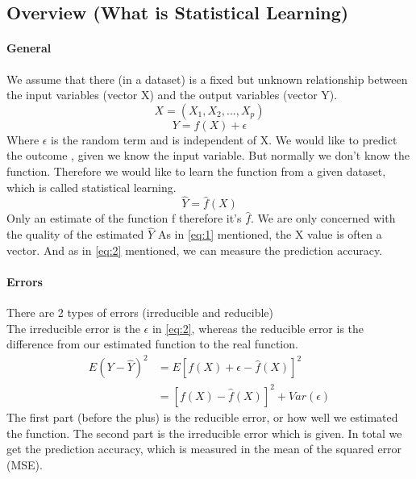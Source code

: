 \documentclass[../document.tex]{subfiles}
\begin{document}
	\subsection{Overview (What is Statistical Learning)}

	\paragraph{General}
	We assume that there (in a dataset) is a fixed but unknown relationship between the input variables (vector X) and the output variables (vector Y).
	\begin{equation} \label{eq:1}
	X = (X_{1},X_{2},...,X_{p})
	\end{equation}
	\begin{equation} \label{eq:2}
	Y=f(X)+\epsilon
	\end{equation}
	Where \(\epsilon\) is the random term and is independent of X.
	We would like to predict the outcome , given we know the input variable. But normally we don't know the function. Therefore we would like to learn the function from a given dataset, which is called statistical learning.\\
	\begin{equation} \label{eq:3}
	\hat{Y} = \hat{f}(X)
	\end{equation}
	Only an estimate of the function f therefore it's \(\hat{f}\). We are only concerned with the quality of the estimated \(\hat{Y}\)
	As in \ref{eq:1} mentioned, the X value is often a vector. And as in \ref{eq:2} mentioned, we can measure the prediction accuracy.\\

	\paragraph{Errors}
	There are 2 types of errors (irreducible and reducible)\\
	The irreducible error is the \(\epsilon\) in \ref{eq:2}, whereas the reducible error is the difference from our estimated function to the real function.
	\begin{equation}
	\begin{split}
	E(Y-\hat{Y})^2 &= E[f(X)+\epsilon-\hat{f}(X)]^2 \\
	&= [f(X)-\hat{f}(X)]^2+Var(\epsilon)
	\end{split}
	\end{equation}
	The first part (before the plus) is the reducible error, or how well we estimated the function. The second part is the irreducible error which is given. In total we get the prediction accuracy, which is measured in the mean of the squared error (MSE).
\end{document}
